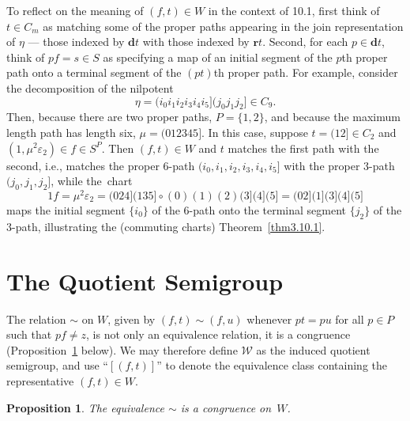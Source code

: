 \documentclass{surv-l}
\numberwithin{equation}{section}
\numberwithin{table}{section}
\numberwithin{figure}{section}
\newtheorem{proposition}[equation]{Proposition}
\theoremstyle{definition}
\begin{document}
To reflect on the meaning of $(f,t)\in W$ in the context of
10.1, first think of $t\in C_{m}$ as matching some of the proper
paths appearing in the join representation of $\eta$ --- those
indexed by $\textbf{d}t$ with those indexed by $\textbf{r}t$.
Second, for each $p\in \textbf{d}t$, think of $pf=s\in S$ as
specifying a map of an initial segment of the $p$th proper path
onto a terminal segment of the $(pt)$th proper path. For example,
consider the decomposition of the nilpotent
\[
\eta=(i_{0}i_{1}i_{2}i_{3}i_{4}i_{5}](j_{0}j_{1}j_{2}]\in C_{9}.
\]
Then, because there are two proper paths, $P=\{1,2\}$, and because
the maximum length path has length six, $\mu= (012345]$. In this
case, suppose $t=(12]\in C_{2}$ and $(1,\mu^{2}\varepsilon_{2})\in
f\in S^{P}$. Then $(f,t)\in W$ and $t$ matches the first path with
the second, i.e., matches the proper 6-path $(i_{0},
i_{1},i_{2},i_{3},i_{4},i_{5}]$ with the proper 3-path
$(j_{0},j_{1},j_{2}]$, while the~chart
\[
1 f=\mu^{2}\varepsilon_{2}=(024](135]\circ(0)(1)(2)(3](4](5]=(02](1](3](4](5]
\]
maps the initial segment $\{i_{0}\}$ of the 6-path onto the
terminal segment $\{j_{2}\}$ of the 3-path, illustrating the
(commuting charts)
Theorem~\ref{thm3.10.1}.

\section{The Quotient Semigroup}\label{sec5.19}

The relation $\sim$ on $W$, given by $(f,t)\sim(f,u)$ whenever
$pt=pu$ for all $p\in P$ such that $pf\neq z$, is not only an
equivalence relation, it is a congruence
(Proposition~\ref{prop5.19.1} below). We may therefore define
$\mathcal{W}$ as the induced quotient semigroup, and use
``$[(f,t)]$'' to denote the equivalence class containing the
representative $(f,t)\in W$.

\begin{proposition}\label{prop5.19.1}
The equivalence $\sim$ is a congruence on~$W$.
\end{proposition}
\end{document}
